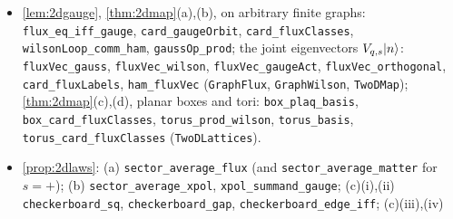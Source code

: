 \begin{itemize}[leftmargin=1.5em,itemsep=1pt]
(\texttt{DimerTransfer}); \cref{lem:dimerTL}, with $\Lambda'$ finite or $\Lambda'=\Z$ in (ii): \texttt{dimerTL\_i},
\texttt{dimerTL\_ii}, \texttt{dimerTL\_ii\_Z}, \texttt{dimerTL\_iii} (\texttt{DimerTL}, \texttt{DimerInfVol});
\cref{prop:dimerlower} on finite intervals, with the Plancherel identity \eqref{eq:plancherel}, and on $\Z$:
\texttt{dimerMom\_plancherel}, \texttt{dimer\_lower\_bound}, \texttt{dimer\_lower\_bound\_Z} (\texttt{DimerLower},
\texttt{DimerInfVol}); \cref{lem:dimersecond,prop:dimersuper}: \texttt{dimer\_second\_moment},
\texttt{integral\_hs2\_tmProd\_le}, \texttt{dimer\_super\_annealed}, \texttt{dimer\_super\_ae} (\texttt{DimerSecond},
\texttt{DimerSuper}); \cref{thm:dimer}(a)--(d), sector by sector and for the single-fermion dimer state:
\texttt{dimer\_sector\_moment\_lower}, \texttt{dimer\_LGT\_moment\_lower}, \texttt{dimer\_TL\_D}, \texttt{dimer\_TL\_M},
\texttt{dimer\_LGT\_TL\_D}, \texttt{dimer\_LGT\_TL\_M}, \texttt{dimerMInf\_lower}, \texttt{dimerMInf\_super},
\texttt{dimerMInf\_exponent}, \texttt{dimer\_sup\_moment\_unbounded}, \texttt{dimerD\_unbounded\_half},
\texttt{dimer\_LGT\_unbounded\_half}, \texttt{not\_EC\_dimer\_half} (\texttt{DimerLGT}, \texttt{DimerInfVol},
\texttt{DimerState}, \texttt{DimerSuper});
\cref{prop:dimerimbalance} and \cref{lem:fewapprox}: \texttt{dimer\_stagWeight\_identity},
\texttt{dimerImbalance\_timeAvg}, \texttt{card\_eig\_near\_le}, \texttt{dimerImbInf\_le},
\texttt{dimerImbInf\_tendsto\_zero} (\texttt{DimerImbalance}, \texttt{DimerImbalanceLim}).
\item \cref{lem:2dgauge}, \cref{thm:2dmap}(a),(b), on arbitrary finite graphs:
\texttt{flux\_eq\_iff\_gauge}, \texttt{card\_gaugeOrbit}, \texttt{card\_fluxClasses},
\texttt{wilsonLoop\_comm\_ham}, \texttt{gaussOp\_prod}; the joint eigenvectors $V_{q,s}|n\rangle$:
\texttt{fluxVec\_gauss}, \texttt{fluxVec\_wilson}, \texttt{fluxVec\_gaugeAct},
\texttt{fluxVec\_orthogonal}, \texttt{card\_fluxLabels}, \texttt{ham\_fluxVec} (\texttt{GraphFlux},
\texttt{GraphWilson}, \texttt{TwoDMap}); \cref{thm:2dmap}(c),(d), planar boxes and tori:
\texttt{box\_plaq\_basis}, \texttt{box\_card\_fluxClasses}, \texttt{torus\_prod\_wilson},
\texttt{torus\_basis}, \texttt{torus\_card\_fluxClasses} (\texttt{TwoDLattices}).
\item \cref{prop:2dlaws}: (a) \texttt{sector\_average\_flux} (and \texttt{sector\_average\_matter}
for $s=+$); (b) \texttt{sector\_average\_xpol}, \texttt{xpol\_summand\_gauge}; (c)(i),(ii)
\texttt{checkerboard\_sq}, \texttt{checkerboard\_gap}, \texttt{checkerboard\_edge\_iff}; (c)(iii),(iv)

\end{itemize}
